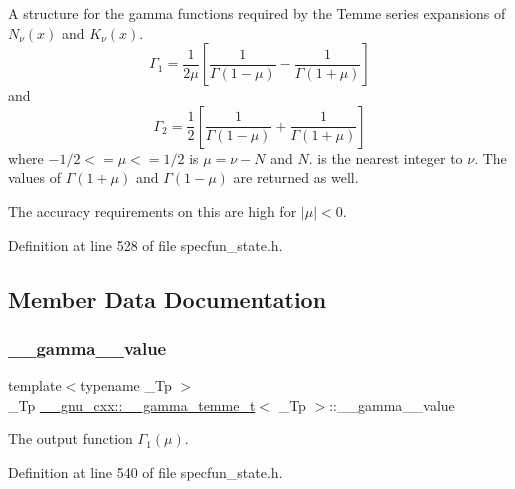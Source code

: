 A structure for the gamma functions required by the Temme series expansions of $ N_\nu(x) $ and $ K_\nu(x) $. \[ \Gamma_1 = \frac{1}{2\mu} \left[\frac{1}{\Gamma(1 - \mu)} - \frac{1}{\Gamma(1 + \mu)}\right] \] and \[ \Gamma_2 = \frac{1}{2} \left[\frac{1}{\Gamma(1 - \mu)} + \frac{1}{\Gamma(1 + \mu)}\right] \] where $ -1/2 <= \mu <= 1/2 $ is $ \mu = \nu - N $ and $ N $. is the nearest integer to $ \nu $. The values of $ \Gamma(1 + \mu) $ and $ \Gamma(1 - \mu) $ are returned as well. 

The accuracy requirements on this are high for $ |\mu| < 0 $. 

Definition at line 528 of file specfun\+\_\+state.\+h.



\subsection{Member Data Documentation}
\mbox{\label{struct____gnu__cxx_1_1____gamma__temme__t_a5cd3cdcf5479d232d3ea118c69198215}} 
\subsubsection{\texorpdfstring{\+\_\+\+\_\+gamma\+\_\+\_\+value}{\_\_gamma\_1\_value}}
{\footnotesize\ttfamily template$<$typename \+\_\+\+Tp $>$ \\
\+\_\+\+Tp \hyperlink{struct____gnu__cxx_1_1____gamma__temme__t}{\+\_\+\+\_\+gnu\+\_\+cxx\+::\+\_\+\+\_\+gamma\+\_\+temme\+\_\+t}$<$ \+\_\+\+Tp $>$\+::\+\_\+\+\_\+gamma\+\_\+\_\+value}



The output function $ \Gamma_1(\mu) $. 



Definition at line 540 of file specfun\+\_\+state.\+h.

\mbox{\label{struct____gnu__cxx_1_1____gamma__temme__t_af3113befce3b6bc9c561472fbaff4520}} 

